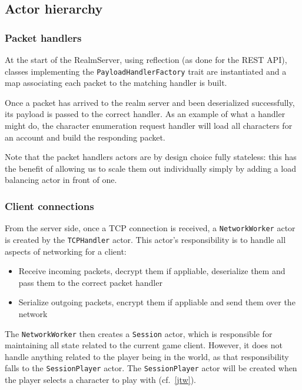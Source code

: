\documentclass[paper=a4, fontsize=11pt]{scrartcl}
\begin{document}

\subsection{Actor hierarchy}

\subsubsection{Packet handlers}

At the start of the RealmServer, using reflection (as done for the REST API),
classes implementing the \texttt{PayloadHandlerFactory} trait are instantiated
and a map associating each packet to the matching handler is built.

Once a packet has arrived to the realm server and been deserialized
successfully, its payload is passed to the correct handler.
As an example of what a handler might do, the character enumeration request
handler will load all characters for an account and build the responding packet.

Note that the packet handlers actors are by design choice fully stateless: this
has the benefit of allowing us to scale them out individually simply by adding a
load balancing actor in front of one.

\subsubsection{Client connections}

From the server side, once a TCP connection is received, a
\texttt{NetworkWorker} actor is created by the \texttt{TCPHandler} actor.
This actor's responsibility is to handle all aspects of networking for a client:
\begin{itemize}
    \item Receive incoming packets, decrypt them if appliable, deserialize them
        and pass them to the correct packet handler
    \item Serialize outgoing packets, encrypt them if appliable and send them
        over the network
\end{itemize}

The \texttt{NetworkWorker} then creates a \texttt{Session} actor, which is
responsible for maintaining all state related to the current game client.
However, it does not handle anything related to the player being in the world,
as that responsibility falls to the \texttt{SessionPlayer} actor.
The \texttt{SessionPlayer} actor will be created when the player selects a
character to play with (cf.~\ref{jtw}).
\end{document}
